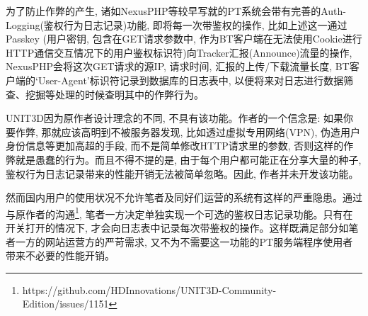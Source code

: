 为了防止作弊的产生, 诸如NexusPHP等较早写就的PT系统会带有完善的Auth-Logging(鉴权行为日志记录)功能, 即将每一次带鉴权的操作, 比如上述这一通过Passkey (用户密钥, 包含在GET请求参数中, 作为BT客户端在无法使用Cookie进行HTTP通信交互情况下的用户鉴权标识符)向Tracker汇报(Announce)流量的操作, NexusPHP会将这次GET请求的源IP, 请求时间, 汇报的上传/下载流量长度, BT客户端的`User-Agent'标识符记录到数据库的日志表中, 以便将来对日志进行数据筛查、挖掘等处理的时候查明其中的作弊行为。

UNIT3D因为原作者设计理念的不同, 不具有该功能。作者的一个信念是: 如果你要作弊, 那就应该高明到不被服务器发现, 比如透过虚拟专用网络(VPN), 伪造用户身份信息等更加高超的手段, 而不是简单修改HTTP请求里的参数, 否则这样的作弊就是愚蠢的行为。而且不得不提的是, 由于每个用户都可能正在分享大量的种子, 鉴权行为日志记录带来的性能开销无法被简单忽略。因此, 作者并未开发该功能。

然而国内用户的使用状况不允许笔者及同好们运营的系统有这样的严重隐患。通过与原作者的沟通\footnote{https://github.com/HDInnovations/UNIT3D-Community-Edition/issues/1151}, 笔者一方决定单独实现一个可选的鉴权日志记录功能。只有在开关打开的情况下, 才会向日志表中记录每次带鉴权的操作。这样既满足部分如笔者一方的网站运营方的严苛需求, 又不为不需要这一功能的PT服务端程序使用者带来不必要的性能开销。





